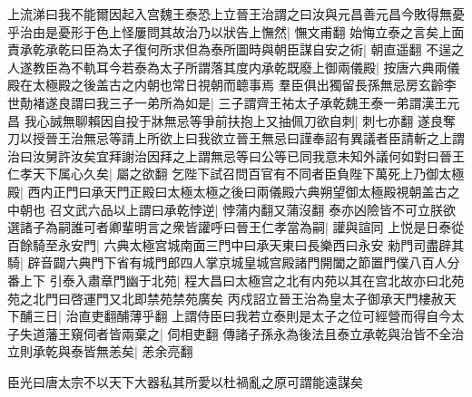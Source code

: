 上流涕曰我不能爾因起入宫魏王泰恐上立晉王治謂之曰汝與元昌善元昌今敗得無憂乎治由是憂形于色上怪屢問其故治乃以狀告上憮然|{
	憮文甫翻}
始悔立泰之言矣上面責承乾承乾曰臣為太子復何所求但為泰所圖時與朝臣謀自安之術|{
	朝直遥翻}
不逞之人遂教臣為不軌耳今若泰為太子所謂落其度内承乾既廢上御兩儀殿|{
	按唐六典兩儀殿在太極殿之後盖古之内朝也常日視朝而聼事焉}
羣臣俱出獨留長孫無忌房玄齡李世勣褚遂良謂曰我三子一弟所為如是|{
	三子謂齊王祐太子承乾魏王泰一弟謂漢王元昌}
我心誠無聊賴因自投于牀無忌等爭前扶抱上又抽佩刀欲自刺|{
	刺七亦翻}
遂良奪刀以授晉王治無忌等請上所欲上曰我欲立晉王無忌曰謹奉詔有異議者臣請斬之上謂治曰汝舅許汝矣宜拜謝治因拜之上謂無忌等曰公等已同我意未知外議何如對曰晉王仁孝天下属心久矣|{
	屬之欲翻}
乞陛下試召問百官有不同者臣負陛下萬死上乃御太極殿|{
	西内正門曰承天門正殿曰太極太極之後曰兩儀殿六典朔望御太極殿視朝盖古之中朝也}
召文武六品以上謂曰承乾悖逆|{
	悖蒲内翻又蒲沒翻}
泰亦凶險皆不可立朕欲選諸子為嗣誰可者卿輩明言之衆皆讙呼曰晉王仁孝當為嗣|{
	讙與諠同}
上悦是日泰從百餘騎至永安門|{
	六典太極宫城南面三門中曰承天東曰長樂西曰永安}
勑門司盡辟其騎|{
	辟音闢六典門下省有城門郎四人掌京城皇城宫殿諸門開闔之節置門僕八百人分番上下}
引泰入肅章門幽于北苑|{
	程大昌曰太極宫之北有内苑以其在宫北故亦曰北苑苑之北門曰啓運門又北即禁苑禁苑廣矣}
丙戍詔立晉王治為皇太子御承天門樓赦天下酺三日|{
	治直吏翻酺薄乎翻}
上謂侍臣曰我若立泰則是太子之位可經營而得自今太子失道藩王窺伺者皆兩棄之|{
	伺相吏翻}
傳諸子孫永為後法且泰立承乾與治皆不全治立則承乾與泰皆無恙矣|{
	恙余亮翻}


臣光曰唐太宗不以天下大器私其所愛以杜禍亂之原可謂能遠謀矣

